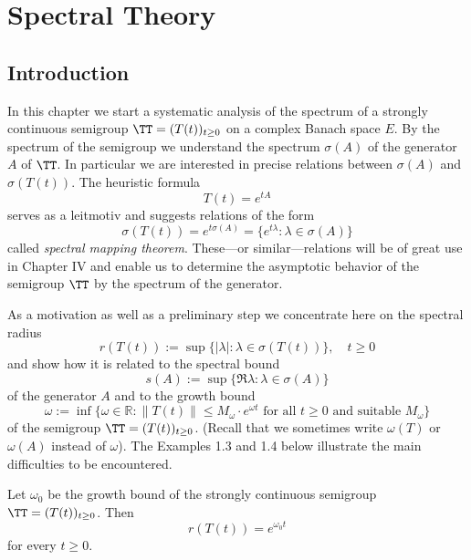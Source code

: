 \chapter{Spectral Theory}\label{chap:A-III}

\section{Introduction}

In this chapter we start a systematic analysis of the spectrum of a strongly continuous semigroup $\TT = (T(t))_{t\geq 0}$ on a complex Banach space $E$.
By the spectrum of the semigroup we understand the spectrum $\sigma(A)$ of the generator $A$ of $\TT$.
In particular we are interested in precise relations between $\sigma(A)$ and $\sigma(T(t))$.
The heuristic formula
\[
T(t) = e^{tA}
\]
serves as a leitmotiv and suggests relations of the form
\[
\sigma(T(t)) = e^{t\sigma(A)} = \{ e^{t\lambda} \colon \lambda \in \sigma(A) \}
\]
called \emph{spectral mapping theorem}.
These---or similar---relations will be of great use in Chapter IV and enable us to determine the asymptotic behavior of the semigroup $\TT$ by the spectrum of the generator.

As a motivation as well as a preliminary step we concentrate here on the spectral radius
\begin{equation}\label{eq:a3-1.1}
	r(T(t)) := \sup \{ |\lambda| : \lambda \in \sigma(T(t)) \}, \quad t \geq 0
\end{equation}
and show how it is related to the spectral bound
\begin{equation}\label{eq:a3-1.2}
	s(A) := \sup \{ \Re\lambda : \lambda \in \sigma(A) \}
\end{equation}
of the generator $A$ and to the growth bound
\begin{equation}\label{eq:a3-1.3}
	\omega := \inf \{\omega \in \mathbb{R} : \|T(t)\| \leq M_{\omega}\cdot e^{\omega t} \text{ for all } t \geq 0 \text{ and suitable } M_{\omega}\}
\end{equation}
of the semigroup $\TT = (T(t))_{t\geq 0}$.
(Recall that we sometimes write $\omega(T)$ or $\omega(A)$ instead of $\omega$).
The Examples 1.3 and 1.4 below illustrate the main difficulties to be encountered.
\begin{proposition}\label{prop:1.1}
Let $\omega_{0}$ be the growth bound of the strongly continuous semigroup $\TT = (T(t))_{t\geq 0}$.
Then
\[
r(T(t)) = e^{\omega_{0} t}
\]
for every $t \geq 0$.
\end{proposition}

